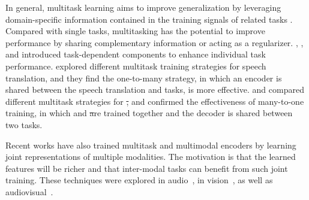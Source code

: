 In general, multitask learning aims to improve generalization by leveraging domain-specific information contained in the training signals of related tasks \citep{caruana1997multitask,vandenhende2021multi}. Compared with single tasks, multitasking has the potential to improve performance by sharing complementary information or acting as a regularizer.  \cite{maninis2019attentive}, \cite{liu2019end}, and \cite{pfeiffer-etal-2020-mad} introduced task-dependent components to enhance individual task performance. \cite{weiss2017sequence} explored different multitask training strategies for speech translation, and they find the one-to-many strategy, in which an encoder is shared between the speech translation and \asr tasks, is more effective.  \cite{Bahar2019ACS} and \cite{tang-etal-2021-improving} compared different multitask strategies for \st, and confirmed the effectiveness of many-to-one training, in which \mt and \st are trained together and the decoder is shared between two tasks.

Recent works have also trained multitask and multimodal encoders by learning joint representations of multiple modalities. The motivation is that the learned features will be richer and that inter-modal tasks can benefit from such joint training.
These techniques were explored in audio~\citep{Maestro,mslam,google_usm,Rubenstein2023AudioPaLMAL}, in vision~\citep{chen2020uniter,gan2020large,fu2021violet}, as well as audiovisual~\citep{shi2022learning,anwar2023muavic}.










